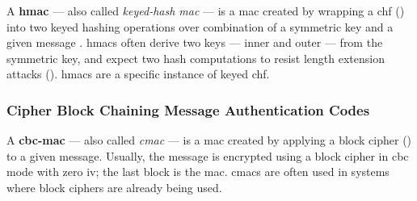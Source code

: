 A \textbf{\gls{hmac}} --- also called \textit{keyed-hash \gls{mac}} --- is a \gls{mac} created by wrapping a \gls{chf} () into two keyed hashing operations over combination of a symmetric key and a given message \cite{krawczyk_hmac_1997}. \glspl{hmac} often derive two keys --- inner and outer --- from the symmetric key, and expect two hash computations to resist length extension attacks (). \glspl{hmac} are a specific instance of keyed \gls{chf}.

\subsubsection{Cipher Block Chaining Message Authentication Codes}\label{sec:symmetric_cryptography:cbc_mac}

A \textbf{\gls{cbc}-\gls{mac}} --- also called \textit{\gls{cmac}} --- is a \gls{mac} created by applying a block cipher () to a given message. Usually, the message is encrypted using a block cipher in \gls{cbc} mode with zero \gls{iv}; the last block is the \gls{mac}. \glspl{cmac} are often used in systems where block ciphers are already being used.
